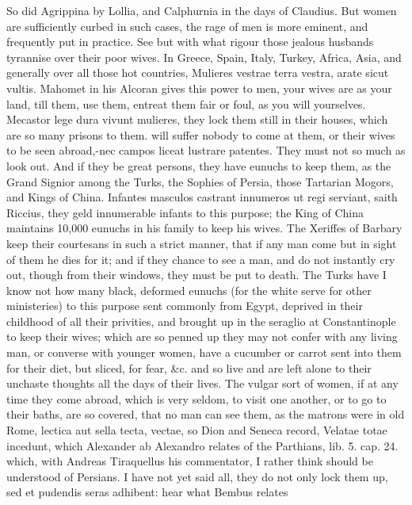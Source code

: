 {So did Agrippina by Lollia, and Calphurnia in the days of Claudius. But
women are sufficiently curbed in such cases, the rage of men is more
eminent, and frequently put in practice. See but with what rigour those
jealous husbands tyrannise over their poor wives. In Greece, Spain,
Italy, Turkey, Africa, Asia, and generally over all those hot
countries,  Mulieres vestrae terra vestra, arate sicut vultis.
Mahomet in his Alcoran gives this power to men, your wives are as your
land, till them, use them, entreat them fair or foul, as you will
yourselves. Mecastor lege dura vivunt mulieres, they lock them
still in their houses, which are so many prisons to them. will suffer
nobody to come at them, or their wives to be seen abroad,-nec campos
liceat lustrare patentes. They must not so much as look out. And if
they be great persons, they have eunuchs to keep them, as the Grand
Signior among the Turks, the Sophies of Persia, those Tartarian Mogors,
and Kings of China. Infantes masculos castrant innumeros ut regi
serviant, saith Riccius, they geld innumerable infants to this
purpose; the King of China maintains 10,000 eunuchs in his family
to keep his wives. The Xeriffes of Barbary keep their courtesans in
such a strict manner, that if any man come but in sight of them he dies
for it; and if they chance to see a man, and do not instantly cry out,
though from their windows, they must be put to death. The Turks have I
know not how many black, deformed eunuchs (for the white serve for
other ministeries) to this purpose sent commonly from Egypt, deprived
in their childhood of all their privities, and brought up in the
seraglio at Constantinople to keep their wives; which are so penned up
they may not confer with any living man, or converse with younger
women, have a cucumber or carrot sent into them for their diet, but
sliced, for fear, \&c. and so live and are left alone to their unchaste
thoughts all the days of their lives. The vulgar sort of women, if at
any time they come abroad, which is very seldom, to visit one another,
or to go to their baths, are so covered, that no man can see them, as
the matrons were in old Rome, lectica aut sella tecta, vectae, so
Dion and Seneca record, Velatae totae incedunt, which
Alexander ab Alexandro relates of the Parthians, lib. 5. cap. 24.
which, with Andreas Tiraquellus his commentator, I rather think should
be understood of Persians. I have not yet said all, they do not only
lock them up, sed et pudendis seras adhibent: hear what Bembus relates
}
